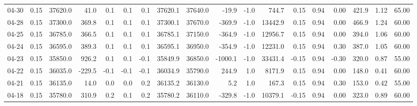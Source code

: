\begin{threeparttable}
{\begin{tabular}{lrrrrrrrrrrrrrrrrr}
  04-30 &     0.15 & 37620.0 &              41.0 &               0.1 &                0.1 &                0.1 & 37620.1 & 37640.0 &      -19.9 &                     -1.0 &               744.7 &       0.15 &      0.94 &           0.00 &            421.9 &            1.12 &                  65.00 \\
  04-28 &     0.15 & 37300.0 &             369.8 &               0.1 &                0.1 &                0.1 & 37300.1 & 37670.0 &     -369.9 &                     -1.0 &             13442.9 &       0.15 &      0.94 &           0.00 &            466.9 &            1.24 &                  60.00 \\
  04-25 &     0.15 & 36785.0 &             366.5 &               0.1 &                0.1 &                0.1 & 36785.1 & 37150.0 &     -364.9 &                     -1.0 &             12956.7 &       0.15 &      0.94 &           0.00 &            394.0 &            1.06 &                  60.00 \\
  04-24 &     0.15 & 36595.0 &             389.3 &               0.1 &                0.1 &                0.1 & 36595.1 & 36950.0 &     -354.9 &                     -1.0 &             12231.0 &       0.15 &      0.94 &           0.30 &            387.0 &            1.05 &                  60.00 \\
  04-23 &     0.15 & 35850.0 &             926.2 &               0.1 &                0.1 &               -0.1 & 35849.9 & 36850.0 &    -1000.1 &                     -1.0 &             33431.4 &      -0.15 &      0.94 &          -0.30 &            320.0 &            0.87 &                  55.00 \\
  04-22 &     0.15 & 36035.0 &            -229.5 &              -0.1 &               -0.1 &               -0.1 & 36034.9 & 35790.0 &      244.9 &                      1.0 &              8171.9 &       0.15 &      0.94 &           0.00 &            148.0 &            0.41 &                  60.00 \\
  04-21 &     0.15 & 36135.0 &              14.0 &               0.0 &                0.0 &                0.2 & 36135.2 & 36130.0 &        5.2 &                      1.0 &               167.3 &       0.15 &      0.94 &           0.30 &            153.0 &            0.42 &                  55.00 \\
  04-18 &     0.15 & 35780.0 &             310.9 &               0.2 &                0.1 &                0.2 & 35780.2 & 36110.0 &     -329.8 &                     -1.0 &             10379.1 &      -0.15 &      0.94 &           0.00 &            323.0 &            0.89 &                  60.00 \\

\end{tabular}}
\end{threeparttable}
